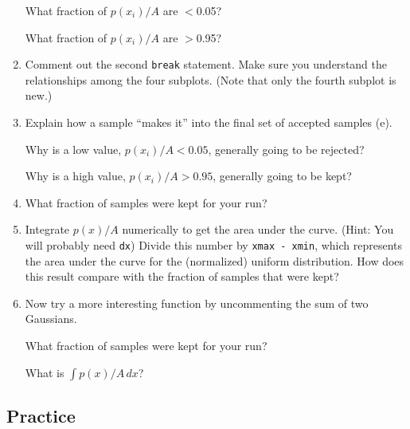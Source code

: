 \documentclass[11pt,titlepage,fleqn]{article}
\begin{document}
\begin{enumerate}
What fraction of $p(x_i)/A$ are $<$0.05?

What fraction of $p(x_i)/A$ are $>$0.95?

\vertgap

\item Comment out the second \verb+break+ statement. Make sure you understand the relationships among the four subplots. (Note that only the fourth subplot is new.)

\vertgap

\item Explain how a sample ``makes it'' into the final set of accepted samples (e).

Why is a low value, $p(x_i)/A < 0.05$, generally going to be rejected?

Why is a high value, $p(x_i)/A > 0.95$, generally going to be kept?

\vertgap

\item What fraction of samples were kept for your run?

\vertgap

\item Integrate $p(x)/A$ numerically to get the area under the curve. (Hint: You will probably need \verb+dx+) Divide this number by \verb+xmax - xmin+, which represents the area under the curve for the (normalized) uniform distribution. How does this result compare with the fraction of samples that were kept?

\vertgap

\item Now try a more interesting function by uncommenting the sum of two Gaussians.

What fraction of samples were kept for your run?

What is $\int p(x)/A \, dx$?

\end{enumerate}


\subsection*{Practice}
\end{document}
